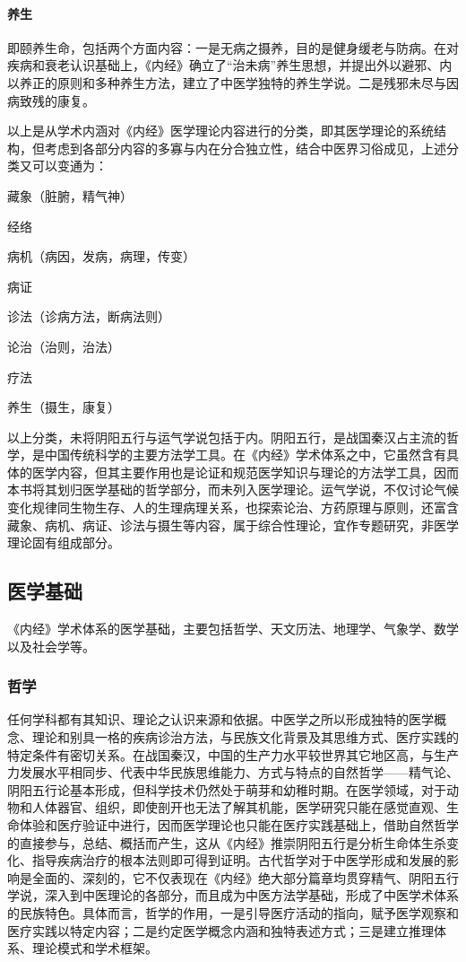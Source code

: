 \documentclass[draft,12pt]{ctexbook}
\begin{document}
\paragraph{养生}  即颐养生命，包括两个方面内容：一是无病之摄养，目的是健身缓老与防病。在对疾病和衰老认识基础上，《内经》确立了“治未病”养生思想，并提出外以避邪、内以养正的原则和多种养生方法，建立了中医学独特的养生学说。二是残邪未尽与因病致残的康复。

以上是从学术内涵对《内经》医学理论内容进行的分类，即其医学理论的系统结构，但考虑到各部分内容的多寡与内在分合独立性，结合中医界习俗成见，上述分类又可以变通为：

藏象（脏腑，精气神）

经络

病机（病因，发病，病理，传变）

病证

诊法（诊病方法，断病法则）

论治（治则，治法）

疗法

养生（摄生，康复）

以上分类，未将阴阳五行与运气学说包括于内。阴阳五行，是战国秦汉占主流的哲学，是中国传统科学的主要方法学工具。在《内经》学术体系之中，它虽然含有具体的医学内容，但其主要作用也是论证和规范医学知识与理论的方法学工具，因而本书将其划归医学基础的哲学部分，而未列入医学理论。运气学说，不仅讨论气候变化规律同生物生存、人的生理病理关系，也探索论治、方药原理与原则，还富含藏象、病机、病证、诊法与摄生等内容，属于综合性理论，宜作专题研究，非医学理论固有组成部分。

\subsection{医学基础} %

《内经》学术体系的医学基础，主要包括哲学、天文历法、地理学、气象学、数学以及社会学等。

\subsubsection{哲学}%

任何学科都有其知识、理论之认识来源和依据。中医学之所以形成独特的医学概念、理论和别具一格的疾病诊治方法，与民族文化背景及其思维方式、医疗实践的特定条件有密切关系。在战国秦汉，中国的生产力水平较世界其它地区高，与生产力发展水平相同步、代表中华民族思维能力、方式与特点的自然哲学——精气论、阴阳五行论基本形成，但科学技术仍然处于萌芽和幼稚时期。在医学领域，对于动物和人体器官、组织，即使剖开也无法了解其机能，医学研究只能在感觉直观、生命体验和医疗验证中进行，因而医学理论也只能在医疗实践基础上，借助自然哲学的直接参与，总结、概括而产生，这从《内经》推崇阴阳五行是分析生命体生杀变化、指导疾病治疗的根本法则即可得到证明。古代哲学对于中医学形成和发展的影响是全面的、深刻的，它不仅表现在《内经》绝大部分篇章均贯穿精气、阴阳五行学说，深入到中医理论的各部分，而且成为中医方法学基础，形成了中医学术体系的民族特色。具体而言，哲学的作用，一是引导医疗活动的指向，赋予医学观察和医疗实践以特定内容；二是约定医学概念内涵和独特表述方式；三是建立推理体系、理论模式和学术框架。
\end{document}
